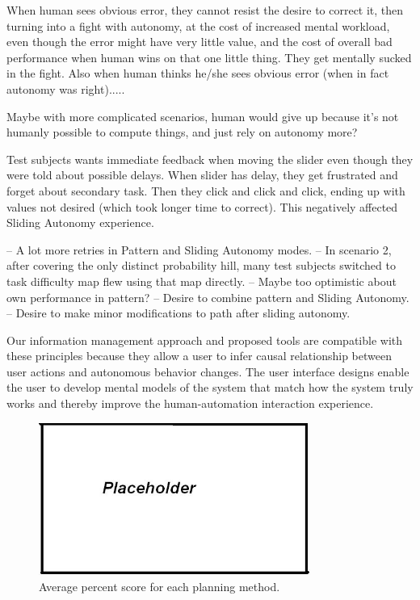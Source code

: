 \documentclass[journal]{IEEEtran}
\begin{document}
When human sees obvious error, they cannot resist the desire to correct it, then turning into a fight with autonomy, at the cost of increased mental workload, even though the error might have very little value, and the cost of overall bad performance when human wins on that one little thing. They get mentally sucked in the fight. Also when human thinks he/she sees obvious error (when in fact autonomy was right).....

Maybe with more complicated scenarios, human would give up because it's not humanly possible to compute things, and just rely on autonomy more?

Test subjects wants immediate feedback when moving the slider even though they were told about possible delays. When slider has delay, they get frustrated and forget about secondary task. Then they click and click and click, ending up with values not desired (which took longer time to correct). This negatively affected Sliding Autonomy experience.


-- A lot more retries in Pattern and Sliding Autonomy modes.
-- In scenario 2, after covering the only distinct probability hill, many test subjects switched to task difficulty map flew using that map directly.
-- Maybe too optimistic about own performance in pattern?
-- Desire to combine pattern and Sliding Autonomy.
-- Desire to make minor modifications to path after sliding autonomy.

Our information management approach and proposed tools are compatible with these principles because they allow a user to infer causal relationship between user actions and autonomous behavior changes. The user interface designs enable the user to develop mental models of the system that match how the system truly works and thereby improve the human-automation interaction experience.


\begin{figure}
\centering
\includegraphics[width=3.5in]{placeholder.JPG}
\caption{Average percent score for each planning method.}
\label{PercentScoreGraph}
\end{figure}
\end{document}
